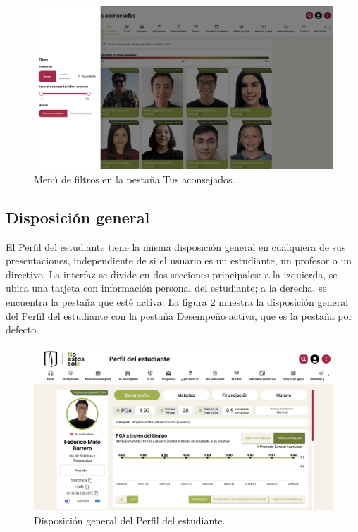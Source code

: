 \begin{figure}[H]
	\centering
	\includegraphics[width=\textwidth]{assets/nes/filtros.png}
	\caption{Menú de filtros en la pestaña Tus aconsejados.}
	\label{fig:filtros}
\end{figure}

\subsection{Disposición general}

El Perfil del estudiante tiene la misma disposición general en cualquiera de sus presentaciones, independiente de si el usuario es un estudiante, un profesor o un directivo. La interfaz se divide en dos secciones principales: a la izquierda, se ubica una tarjeta con información personal del estudiante; a la derecha, se encuentra la pestaña que esté activa. La figura \ref{fig:perfil} muestra la disposición general del Perfil del estudiante con la pestaña Desempeño activa, que es la pestaña por defecto.

\begin{figure}[H]
	\centering
	\includegraphics[width=\textwidth]{assets/nes/perfil.png}
	\caption{Disposición general del Perfil del estudiante.}
	\label{fig:perfil}
\end{figure}


